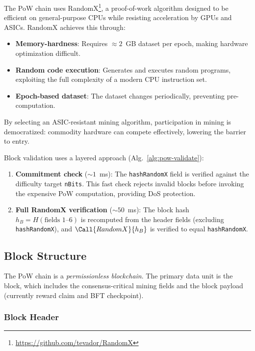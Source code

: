 The PoW chain uses RandomX\footnote{\url{https://github.com/tevador/RandomX}}, a proof-of-work algorithm designed to be efficient on general-purpose CPUs while resisting acceleration by GPUs and ASICs. RandomX achieves this through:
\begin{itemize}[nosep]
  \item \textbf{Memory-hardness}: Requires $\approx 2$~GB dataset per epoch, making hardware optimization difficult.
  \item \textbf{Random code execution}: Generates and executes random programs, exploiting the full complexity of a modern CPU instruction set.
  \item \textbf{Epoch-based dataset}: The dataset changes periodically, preventing pre-computation.
\end{itemize}

By selecting an ASIC-resistant mining algorithm, participation in mining is democratized: commodity hardware can compete effectively, lowering the barrier to entry.

Block validation uses a layered approach (Alg.~\ref{alg:pow-validate}):
\begin{enumerate}[nosep]
  \item \textbf{Commitment check} ($\sim 1$~ms): The \texttt{hashRandomX} field is verified against the difficulty target \texttt{nBits}. This fast check rejects invalid blocks before invoking the expensive PoW computation, providing DoS protection.
  \item \textbf{Full RandomX verification} ($\sim 50$~ms): The block hash $h_B = H(\text{fields 1--6})$ is recomputed from the header fields (excluding \texttt{hashRandomX}), and $\Call{RandomX}{h_B}$ is verified to equal \texttt{hashRandomX}.
\end{enumerate}


\subsection{Block Structure}\label{sec:pow-block-structure}

The PoW chain is a \emph{permissionless blockchain}. The primary data unit is the block, which includes the consensus-critical mining fields and the block payload (currently reward claim and BFT checkpoint).

\subsubsection{Block Header}\label{sec:pow-block-format}

